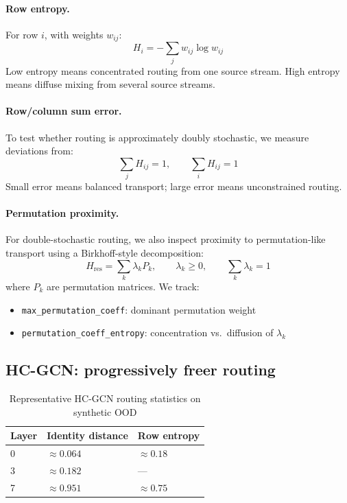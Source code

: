\documentclass[11pt,a4paper]{article}
\begin{document}
\paragraph{Row entropy.}
For row $i$, with weights $w_{ij}$:
\[
H_i = -\sum_j w_{ij}\log w_{ij}
\]
Low entropy means concentrated routing from one source stream.
High entropy means diffuse mixing from several source streams.

\paragraph{Row/column sum error.}
To test whether routing is approximately doubly stochastic, we measure
deviations from:
\[
\sum_j H_{ij} = 1,
\qquad
\sum_i H_{ij} = 1
\]
Small error means balanced transport; large error means unconstrained routing.

\paragraph{Permutation proximity.}
For double-stochastic routing, we also inspect proximity to permutation-like transport
using a Birkhoff-style decomposition:
\[
H_{\mathrm{res}} = \sum_k \lambda_k P_k,
\qquad
\lambda_k \ge 0,
\qquad
\sum_k \lambda_k = 1
\]
where $P_k$ are permutation matrices.
We track:
\begin{itemize}[noitemsep]
  \item \texttt{max\_permutation\_coeff}: dominant permutation weight
  \item \texttt{permutation\_coeff\_entropy}: concentration vs.\ diffusion of $\lambda_k$
\end{itemize}

\subsection{HC-GCN: progressively freer routing}

\begin{table}[h]
\centering
\caption{Representative HC-GCN routing statistics on synthetic OOD}
\begin{tabular}{C{1.5cm} R{3cm} R{3cm}}
\toprule
Layer & Identity distance & Row entropy \\
 & $\approx 0.064$ & $\approx 0.18$ \\
3 & $\approx 0.182$ & --- \\
7 & $\approx 0.951$ & $\approx 0.75$ \\
\bottomrule
\end{tabular}
\end{table}
\end{document}
